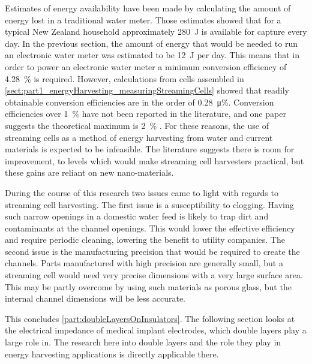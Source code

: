 
Estimates of energy availability have been made by calculating the amount of energy lost in a traditional water meter.
Those estimates showed that for a typical New Zealand household approximately \SI{280}{\joule} is available for capture every day.
In the previous section, the amount of energy that would be needed to run an electronic water meter was estimated to be \SI{12}{\joule} per day.
This means that in order to power an electronic water meter a minimum conversion efficiency of \SI{4.28}{\percent} is required.
However, calculations from cells assembled in \cref{sect:part1_energyHarvesting_measuringStreamingCells} showed that readily obtainable conversion efficiencies are in the order of \SI{0.28}{\micro\percent}.
Conversion efficiencies over \SI{1}{\percent} have not been reported in the literature, and one paper suggests the theoretical maximum is \SI{2}{\percent} \cite{VanderHeyden2006}.
For these reasons, the use of streaming cells as a method of energy harvesting from water and current materials is expected to be infeasible.
The literature suggests there is room for improvement, to levels which would make streaming cell harvesters practical, but these gains are reliant on new nano-materials.

During the course of this research two issues came to light with regards to streaming cell harvesting.
The first issue is a susceptibility to clogging.
Having such narrow openings in a domestic water feed is likely to trap dirt and contaminants at the channel openings.
This would lower the effective efficiency and require periodic cleaning, lowering the benefit to utility companies.
The second issue is the manufacturing precision that would be required to create the channels.
Parts manufactured with high precision are generally small, but a streaming cell would need very precise dimensions with a very large surface area.
This may be partly overcome by using such materials as porous glass, but the internal channel dimensions will be less accurate.

This concludes \cref{part:doubleLayersOnInsulators}.
The following section looks at the electrical impedance of medical implant electrodes, which double layers play a large role in.
The research here into double layers and the role they play in energy harvesting applications is directly applicable there.
